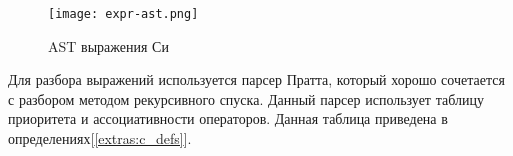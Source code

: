 

\begin{figure}[h!]
    \texttt{[image: expr-ast.png]}
    \centering
    \caption{AST выражения Си}
    \label{parsing:expr-ast-diag}
\end{figure}





Для разбора выражений используется парсер Пратта, который хорошо сочетается с разбором методом рекурсивного спуска.
Данный парсер использует таблицу приоритета и ассоциативности операторов. Данная таблица приведена в определениях[\ref{extras:c_defs}].

